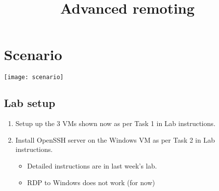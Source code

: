 \documentclass[slides]{pgnotes}
\title{Advanced remoting}
\begin{document}
\maketitle

\tableofcontents

\section{Scenario}

\begin{center}
  \texttt{[image: scenario]}
\end{center}

\subsection{Lab setup}

\begin{enumerate}
\item Setup up the 3 VMs shown now as per Task 1 in Lab instructions.
\item Install OpenSSH server on the Windows VM as per Task 2 in Lab instructions.
  \begin{itemize}
  \item Detailed instructions are in last week's lab.
  \item RDP to Windows does not work (for now)
  \end{itemize}
\end{enumerate}
\end{document}

